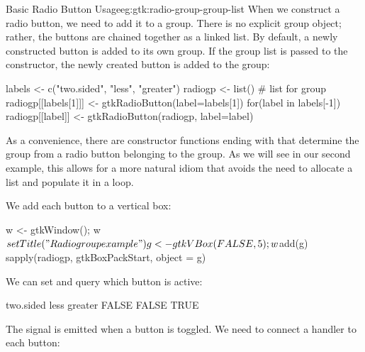 \begin{example}{Basic Radio Button Usage}{eg:gtk:radio-group-group-list} 
  When we construct a radio button, we need to add it to a
  group. There is no explicit group object; rather, the buttons are
  chained together as a linked list. By default, a newly constructed
  button is added to its own group. If the group list is passed to the
  constructor, the newly created button is added to the group:
\begin{Schunk}
\begin{Sinput}
 labels <- c("two.sided", "less", "greater")
 radiogp <- list()                           # list for group
 radiogp[[labels[1]]] <- gtkRadioButton(label=labels[1]) 
 for(label in labels[-1]) 
   radiogp[[label]] <- gtkRadioButton(radiogp, label=label)
\end{Sinput}
\end{Schunk}
%
As a convenience, there are constructor functions ending with
 that determine the group from a radio button
belonging to the group. As we will see in our second example, this
allows for a more natural  idiom that avoids the need
to allocate a list and populate it in a  loop.

We add each button to a vertical box:
\begin{Schunk}
\begin{Sinput}
 w <- gtkWindow(); w$setTitle("Radio group example")
 g <- gtkVBox(FALSE, 5); w$add(g)
 sapply(radiogp, gtkBoxPackStart, object = g)
\end{Sinput}
\end{Schunk}

We can set and query which button is active:
\begin{Schunk}
\begin{Sinput}
 g[[3]]$setActive(TRUE)           
 sapply(radiogp, `[`, "active") 
\end{Sinput}
\begin{Soutput}
two.sided      less   greater 
    FALSE     FALSE      TRUE 
\end{Soutput}
\end{Schunk}

The  signal is emitted when a button is toggled. We need
to connect a handler to each button:
\begin{Schunk}
\end{Schunk}
\end{example}

